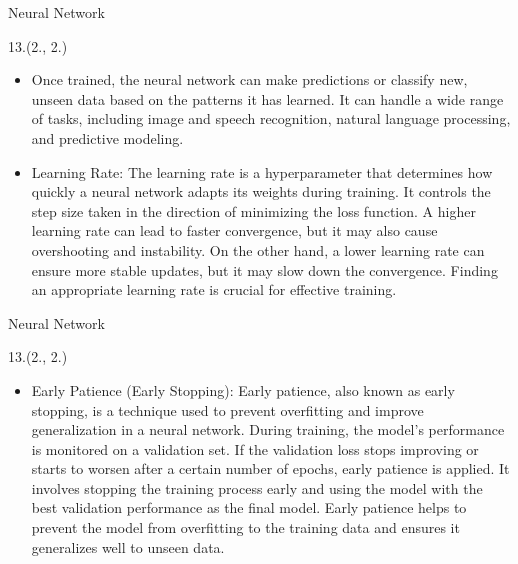 \documentclass[12pt, xcolor={dvipsnames}, aspectratio = 169, sans,mathserif]{beamer}
\newenvironment{List}[2]
{\begin{textblock}{#1}#2
\begin{itemize}}
{\end{itemize}
\end{textblock}}
\begin{document}
\begin{frame}{Neural Network}

\begin{List}{13.}{(2., 2.)}

  \item Once trained, the neural network can make predictions or classify new, unseen data based on the patterns it has learned.
  It can handle a wide range of tasks, including image and speech recognition, natural language processing, and predictive modeling.

  \item Learning Rate: The learning rate is a hyperparameter that determines how quickly a neural network adapts its weights during
  training. It controls the step size taken in the direction of minimizing the loss function. A higher learning rate can lead
  to faster convergence, but it may also cause overshooting and instability. On the other hand, a lower learning rate can
  ensure more stable updates, but it may slow down the convergence. Finding an appropriate learning rate is crucial for
  effective training.

\end{List}

\end{frame}

\begin{frame}{Neural Network}

\begin{List}{13.}{(2., 2.)}

  \item Early Patience (Early Stopping): Early patience, also known as early stopping, is a technique used to prevent overfitting
  and improve generalization in a neural network. During training, the model's performance is monitored on a validation set. If the
  validation loss stops improving or starts to worsen after a certain number of epochs, early patience is applied. It involves
  stopping the training process early and using the model with the best validation performance as the final model. Early patience
  helps to prevent the model from overfitting to the training data and ensures it generalizes well to unseen data.

\end{List}

\end{frame}
\end{document}
